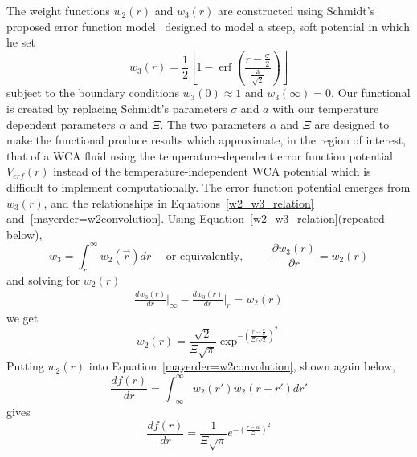 \documentclass[double,12pt]{beavtex}
\begin{document}
The weight functions $w_{2}(r)$ and $w_{3}(r)$ are constructed using 
Schmidt's proposed error function model~\cite{schmidt2000fluid} designed 
to model a steep, soft potential in which he set
\begin{equation}{w_3(r)=\frac{1}{2}}\left[1-\operatorname{erf}\left(\frac{r-\frac{\sigma}{2}}{\frac{\text{a}}{\sqrt{2}}}\right)\right]\end{equation} 
subject to the boundary conditions $w_3(0)\approx{1}$ 
and $w_3(\infty)=0$. 
Our functional is  created by replacing Schmidt's parameters $\sigma$ 
and $a$ with our temperature dependent parameters $\alpha$ and $\Xi$.
The two parameters $\alpha$ and $\Xi$ are designed to make the functional
produce results which approximate, in the region of interest, that of  
a WCA fluid using the temperature-dependent error function potential $V_{erf}(r)$ 
instead of the temperature-independent WCA potential which is difficult 
to implement computationally. 
The error function potential emerges from $w_{3}(r)$, and the relationships 
in Equations~\ref{w2_w3_relation} and~\ref{mayerder=w2convolution}.
Using Equation~\ref{w2_w3_relation}(repeated below),
\begin{displaymath}
     w_{3}=\int_{r}^{\infty}{w_{2}(\vec{r})dr}\mbox{~~~~or equivalently,~~~~}-\frac{\partial{w_3(r)}}{\partial{r}}=w_2(r)
\end{displaymath}
and solving for $w_2(r)$
\begin{align}{\frac{dw_3(r)}{dr}\bigg|_{\infty}-\frac{dw_3(r)}{dr}\bigg|_{r}=w_2(r)}\end{align} 
we get \begin{equation}{ w_2(r)=\frac{\sqrt{2}}{\Xi\sqrt\pi}\exp^{-\left(\frac{r-\frac{\alpha}{2}}{\Xi/\sqrt{2}}\right)^2} }\end{equation} 
Putting $w_2(r)$ into Equation~\ref{mayerder=w2convolution}, shown again below, 
\begin{displaymath}
    \frac{df(r)}{dr}=\int_{-\infty}^{\infty}{w_2(r')w_2(r-r')dr'}
\end{displaymath}
gives
\begin{equation}{\frac{df(r)}{dr}=\frac{1}{\Xi\sqrt{\pi}}e^{-\left(\frac{r-\alpha}{\Xi}\right)^2}}\end{equation} 
\end{document}
